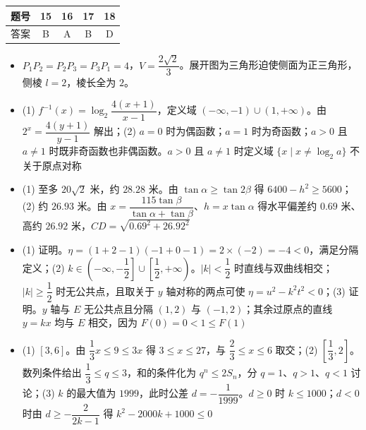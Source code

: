 \begin{center}\begin{tabular}{ccccc}
\toprule
题号 & 15 & 16 & 17 & 18 \\
\midrule
答案 & B & A & B & D \\
\bottomrule
\end{tabular}\end{center}

\begin{itemize}[leftmargin=2.6em]
  \item[\textbf{19.}] $P_1P_2=P_2P_3=P_3P_1=4$，$V=\dfrac{2\sqrt2}3$。展开图为三角形迫使侧面为正三角形，侧棱 $l=2$，棱长全为 $2$。
  \item[\textbf{20.}] (1) $f^{-1}(x)=\log_2\dfrac{4(x+1)}{x-1}$，定义域 $(-\infty,-1)\cup(1,+\infty)$。由 $2^x=\dfrac{4(y+1)}{y-1}$ 解出；(2) $a=0$ 时为偶函数；$a=1$ 时为奇函数；$a>0$ 且 $a\neq1$ 时既非奇函数也非偶函数。$a>0$ 且 $a\neq1$ 时定义域 $\{x\mid x\neq\log_2a\}$ 不关于原点对称
  \item[\textbf{21.}] (1) 至多 $20\sqrt2$ 米，约 $28.28$ 米。由 $\tan\alpha\geqslant\tan2\beta$ 得 $6400-h^2\geqslant5600$；(2) 约 $26.93$ 米。由 $x=\dfrac{115\tan\beta}{\tan\alpha+\tan\beta}$、$h=x\tan\alpha$ 得水平偏差约 $0.69$ 米、高约 $26.92$ 米，$CD=\sqrt{0.69^2+26.92^2}$
  \item[\textbf{22.}] (1) 证明。$\eta=(1+2-1)(-1+0-1)=2\times(-2)=-4<0$，满足分隔定义；(2) $k\in\left(-\infty,-\dfrac12\right]\cup\left[\dfrac12,+\infty\right)$。$|k|<\dfrac12$ 时直线与双曲线相交；$|k|\geqslant\dfrac12$ 时无公共点，且取关于 $y$ 轴对称的两点可使 $\eta=u^2-k^2t^2<0$；(3) 证明。$y$ 轴与 $E$ 无公共点且分隔 $(1,2)$ 与 $(-1,2)$；其余过原点的直线 $y=kx$ 均与 $E$ 相交，因为 $F(0)=0<1\leqslant F(1)$
  \item[\textbf{23.}] (1) $[3,6]$。由 $\dfrac13x\leqslant9\leqslant3x$ 得 $3\leqslant x\leqslant27$，与 $\dfrac23\leqslant x\leqslant6$ 取交；(2) $\left[\dfrac13,2\right]$。数列条件给出 $\dfrac13\leqslant q\leqslant3$，和的条件化为 $q^n\leqslant2S_n$，分 $q=1$、$q>1$、$q<1$ 讨论；(3) $k$ 的最大值为 $1999$，此时公差 $d=-\dfrac1{1999}$。$d\geqslant0$ 时 $k\leqslant1000$；$d<0$ 时由 $d\geqslant-\dfrac2{2k-1}$ 得 $k^2-2000k+1000\leqslant0$
\end{itemize}
